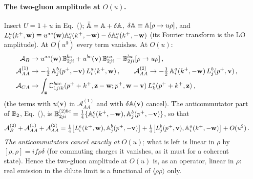 \paragraph{The two-gluon amplitude at $O(u)$.} Insert $U=1+u$ in Eq.~(); $\bar{\mathbb{A}}=\mathbb{A}+\delta\mathbb{A}$, $\delta\mathbb{A}\equiv\mathbb{A}[\rho\to u\rho]$, and $L^a_i(k^+,\mathbf{w})\equiv u^{ac}(\mathbf{w})\mathbb{A}^c_i(k^+,-\mathbf{w})-\delta\mathbb{A}^a_i(k^+,-\mathbf{w})$ (its Fourier transform is the LO amplitude). At $O(u^0)$ every term vanishes. At $O(u)$:
\begin{align}
\mathcal A_B&\to u^{ac}(\mathbf{w})\,\mathbb{B}^{bc}_{2ji}+u^{bc}(\mathbf{v})\,\mathbb{B}^{ca}_{2ji}-\mathbb{B}^{ba}_{2ji}[\rho\to u\rho]\,,\notag\\
\mathcal A^{(1)}_{AA}&\to-\tfrac12\,\mathbb{A}^b_j(p^+,-\mathbf{v})\,L^a_i(k^+,\mathbf{w})\,,\qquad
\mathcal A^{(2)}_{AA}\to-\tfrac12\,\mathbb{A}^a_i(k^+,-\mathbf{w})\,L^b_j(p^+,\mathbf{v})\,,\notag\\
\mathcal A_{CA}&\to\int_{\mathbf{z}}\mathbb{C}^{bac}_{1jik}(p^++k^+,\mathbf{z}-\mathbf{w};p^+,\mathbf{w}-\mathbf{v})\,L^c_k(p^++k^+,\mathbf{z})\,,\label{d:Aexp}
\end{align}
(the terms with $u(\mathbf{v})$ in $\mathcal A^{(1)}_{AA}$ and with $\delta\mathbb{A}(\mathbf{v})$ cancel).
 The anticommutator part of $\mathbb{B}_2$, Eq.~(), is $\mathbb{B}^{(2)bc}_{2ji}=\frac14\{\mathbb{A}^c_i(k^+,-\mathbf{w}),\mathbb{A}^b_j(p^+,-\mathbf{v})\}$, so that
\begin{align}
\mathcal A_B^{(2)}+\mathcal A^{(1)}_{AA}+\mathcal A^{(2)}_{AA}=\tfrac14\big[L^a_i(k^+,\mathbf{w}),\mathbb{A}^b_j(p^+,-\mathbf{v})\big]+\tfrac14\big[L^b_j(p^+,\mathbf{v}),\mathbb{A}^a_i(k^+,-\mathbf{w})\big]+O(u^2)\,.\label{d:comm}
\end{align}
\emph{The anticommutators cancel exactly at $O(u)$}; what is left is linear in $\rho$ by $[\rho,\rho]=if\rho\delta$ (for commuting charges it vanishes, as it must for a coherent state). Hence the two-gluon amplitude at $O(u)$ is, as an operator, linear in $\rho$: real emission in the dilute limit is a functional of $\langle\rho\rho\rangle$ only.

